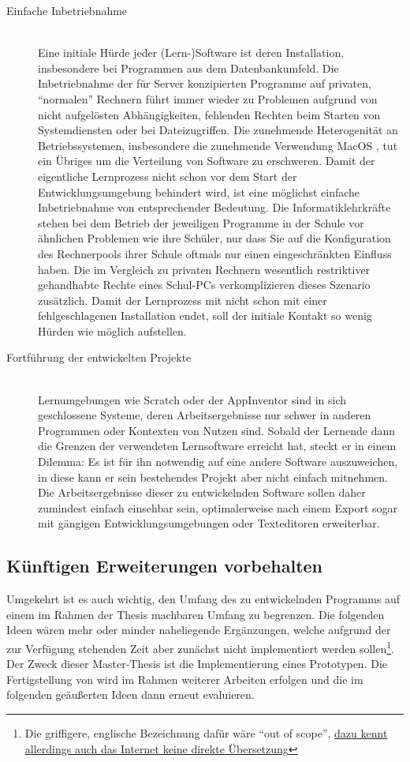 \begin{description}
\item[Einfache Inbetriebnahme] \hfill \\
  Eine initiale Hürde jeder (Lern-)Software ist deren Installation, insbesondere bei Programmen aus dem Datenbankumfeld. Die Inbetriebnahme der für Server konzipierten Programme auf privaten, ``normalen'' Rechnern führt immer wieder zu Problemen aufgrund von nicht aufgelösten Abhängigkeiten, fehlenden Rechten beim Starten von Systemdiensten oder bei Dateizugriffen. Die zunehmende Heterogenität an Betriebssystemen, insbesondere die zunehmende Verwendung MacOS \cite{statista-os-verbreitung}, tut ein Übriges um die Verteilung von Software zu erschweren. Damit der eigentliche Lernprozess nicht schon vor dem Start der Entwicklungsumgebung behindert wird, ist eine möglichst einfache Inbetriebnahme von entsprechender Bedeutung. Die Informatiklehrkräfte stehen bei dem Betrieb der jeweiligen Programme in der Schule vor ähnlichen Problemen wie ihre Schüler, nur dass Sie auf die Konfiguration des Rechnerpools ihrer Schule oftmals nur einen eingeschränkten Einfluss haben. Die im Vergleich zu privaten Rechnern wesentlich restriktiver gehandhabte Rechte eines Schul-PCs verkomplizieren dieses Szenario zusätzlich. Damit der Lernprozess mit \idename nicht schon mit einer fehlgeschlagenen Installation endet, soll der initiale Kontakt so wenig Hürden wie möglich aufstellen.
\item[Fortführung der entwickelten Projekte] \hfill \\
  Lernumgebungen wie Scratch oder der AppInventor sind in sich geschlossene Systeme, deren Arbeitsergebnisse nur schwer in anderen Programmen oder Kontexten von Nutzen sind. Sobald der Lernende dann die Grenzen der verwendeten Lernsoftware erreicht hat, steckt er in einem Dilemma: Es ist für ihn notwendig auf eine andere Software auszuweichen, in diese kann er sein bestehendes Projekt aber nicht einfach mitnehmen. Die Arbeitsergebnisse dieser zu entwickelnden Software sollen daher zumindest einfach einsehbar sein, optimalerweise nach einem Export sogar mit gängigen Entwicklungsumgebungen oder Texteditoren erweiterbar.
\end{description}

\subsection{Künftigen Erweiterungen vorbehalten}
\label{sec:out-of-scope}

Umgekehrt ist es auch wichtig, den Umfang des zu entwickelnden Programms auf einem im Rahmen der Thesis machbaren Umfang zu begrenzen. Die folgenden Ideen wären mehr oder minder naheliegende Ergänzungen, welche aufgrund der zur Verfügung stehenden Zeit aber zunächst nicht implementiert werden sollen\footnote{Die griffigere, englische Bezeichnung dafür wäre "`out of scope"', \href{http://german.stackexchange.com/questions/31085/german-equivalent-to-out-of-scope/}{dazu kennt allerdings auch das Internet keine direkte Übersetzung}}. Der Zweck dieser Master-Thesis ist die Implementierung eines Prototypen. Die Fertigstellung von \idename wird im Rahmen weiterer Arbeiten erfolgen und die im folgenden geäußerten Ideen dann erneut evaluieren.

